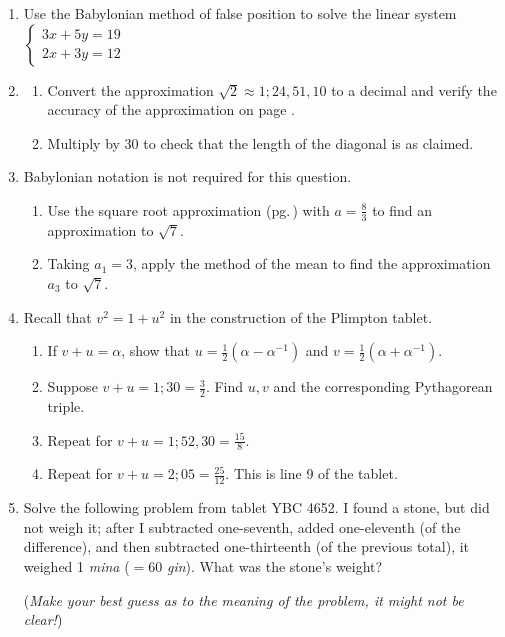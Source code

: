 \begin{exercises*}{}{}
\begin{enumerate}
	
		\item Use the Babylonian method of false position to solve the linear system $\begin{cases}
		3x+5y=19\\
		2x+3y=12
		\end{cases}$
	  
	  
	  \item%
	  \begin{enumerate}
	    \item Convert the approximation $\sqrt 2\approx 1;24,51,10$ to a decimal and verify the accuracy of the approximation on page \pageref{ybc7289}.
	    \item Multiply by 30 to check that the length of the diagonal is as claimed.
	  \end{enumerate}
	  
	  
	  \item Babylonian notation is not required for this question.
	  \begin{enumerate}
	    \item Use the square root approximation (pg.\,\pageref{babroot}) with $a=\frac 83$ to find an approximation to $\sqrt 7$.
	    \item Taking $a_1=3$, apply the method of the mean to find the approximation $a_3$ to $\sqrt 7$.
	  \end{enumerate}
	  
	  
	  \item\label{exs:plimpton}%
	  Recall that $v^2=1+u^2$ in the construction of the Plimpton tablet.
	  \begin{enumerate}
	    \item If $v+u=\alpha$, show that $u=\frac 12(\alpha-\alpha^{-1})$ and $v=\frac 12(\alpha+\alpha^{-1})$.
	    \item Suppose $v+u=1;30=\frac 32$. Find $u,v$ and the corresponding Pythagorean triple.
	  	\item Repeat for $v+u=1;52,30=\frac{15}8$.
	  	\item Repeat for $v+u=2;05=\frac{25}{12}$. This is line 9 of the tablet.
	  \end{enumerate}
	
	  
	  \item%
	  Solve the following problem from tablet YBC 4652. I found a stone, but did not weigh it; after I subtracted one-seventh, added one-eleventh (of the difference), and then subtracted one-thirteenth (of the previous total), it weighed 1 \emph{mina} ($=60$ \emph{gin}). What was the stone's weight?\par
	  (\emph{Make your best guess as to the meaning of the problem, it might not be clear!})
	  

\end{enumerate}
\end{exercises*}
